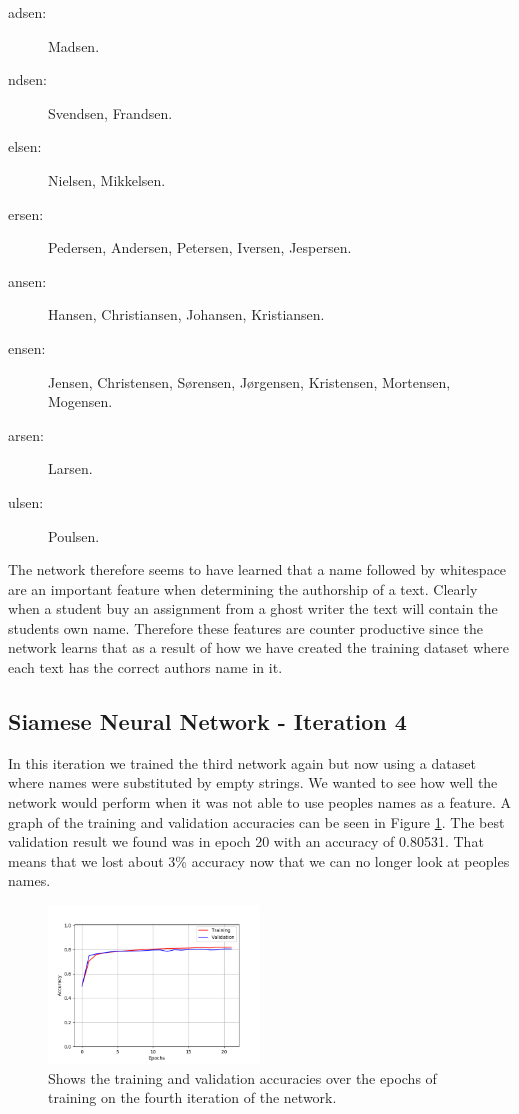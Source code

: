\begin{description}
    \item[adsen:] Madsen.
    \item[ndsen:] Svendsen, Frandsen.
    \item[elsen:] Nielsen, Mikkelsen.
    \item[ersen:] Pedersen, Andersen, Petersen, Iversen, Jespersen.
    \item[ansen:] Hansen, Christiansen, Johansen, Kristiansen.
    \item[ensen:] Jensen, Christensen, S\o rensen, J\o rgensen, Kristensen,
        Mortensen, Mogensen.
    \item[arsen:] Larsen.
    \item[ulsen:] Poulsen.
\end{description}

The network therefore seems to have learned that a name followed by whitespace
are an important feature when determining the authorship of a text. Clearly when
a student buy an assignment from a ghost writer the text will contain the
students own name. Therefore these features are counter productive since the
network learns that as a result of how we have created the training dataset
where each text has the correct authors name in it.


\subsection{Siamese Neural Network - Iteration 4}

In this iteration we trained the third network again but now using a dataset
where names were substituted by empty strings. We wanted to see how well the
network would perform when it was not able to use peoples names as a feature.
A graph of the training and validation accuracies can be seen in Figure
\ref{fig:network_4_accuracies}. The best validation result we found was in epoch
20 with an accuracy of 0.80531. That means that we lost about 3\% accuracy now
that we can no longer look at peoples names.

\begin{figure}
    \centering
    \includegraphics[width=0.5\textwidth]{./pictures/experiments/network_4_accuracies.png}
    \caption{Shows the training and validation accuracies over the epochs of
        training on the fourth iteration of the network.}
    \label{fig:network_4_accuracies}
\end{figure}

